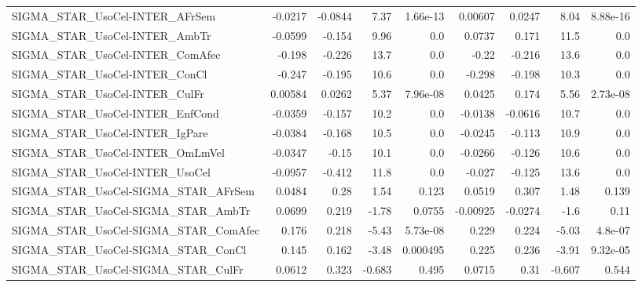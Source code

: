 \begin{tabular}{lrrrrrrrr}
SIGMA\_STAR\_UsoCel-INTER\_AFrSem        &     -0.0217 &      -0.0844 &     7.37 & 1.66e-13 &    0.00607 &      0.0247 &         8.04 &      8.88e-16 \\
SIGMA\_STAR\_UsoCel-INTER\_AmbTr         &     -0.0599 &       -0.154 &     9.96 &      0.0 &     0.0737 &       0.171 &         11.5 &           0.0 \\
SIGMA\_STAR\_UsoCel-INTER\_ComAfec       &      -0.198 &       -0.226 &     13.7 &      0.0 &      -0.22 &      -0.216 &         13.6 &           0.0 \\
SIGMA\_STAR\_UsoCel-INTER\_ConCl         &      -0.247 &       -0.195 &     10.6 &      0.0 &     -0.298 &      -0.198 &         10.3 &           0.0 \\
SIGMA\_STAR\_UsoCel-INTER\_CulFr         &     0.00584 &       0.0262 &     5.37 & 7.96e-08 &     0.0425 &       0.174 &         5.56 &      2.73e-08 \\
SIGMA\_STAR\_UsoCel-INTER\_EnfCond       &     -0.0359 &       -0.157 &     10.2 &      0.0 &    -0.0138 &     -0.0616 &         10.7 &           0.0 \\
SIGMA\_STAR\_UsoCel-INTER\_IgPare        &     -0.0384 &       -0.168 &     10.5 &      0.0 &    -0.0245 &      -0.113 &         10.9 &           0.0 \\
SIGMA\_STAR\_UsoCel-INTER\_OmLmVel       &     -0.0347 &        -0.15 &     10.1 &      0.0 &    -0.0266 &      -0.126 &         10.6 &           0.0 \\
SIGMA\_STAR\_UsoCel-INTER\_UsoCel        &     -0.0957 &       -0.412 &     11.8 &      0.0 &     -0.027 &      -0.125 &         13.6 &           0.0 \\
SIGMA\_STAR\_UsoCel-SIGMA\_STAR\_AFrSem   &      0.0484 &         0.28 &     1.54 &    0.123 &     0.0519 &       0.307 &         1.48 &         0.139 \\
SIGMA\_STAR\_UsoCel-SIGMA\_STAR\_AmbTr    &      0.0699 &        0.219 &    -1.78 &   0.0755 &   -0.00925 &     -0.0274 &         -1.6 &          0.11 \\
SIGMA\_STAR\_UsoCel-SIGMA\_STAR\_ComAfec  &       0.176 &        0.218 &    -5.43 & 5.73e-08 &      0.229 &       0.224 &        -5.03 &       4.8e-07 \\
SIGMA\_STAR\_UsoCel-SIGMA\_STAR\_ConCl    &       0.145 &        0.162 &    -3.48 & 0.000495 &      0.225 &       0.236 &        -3.91 &      9.32e-05 \\
SIGMA\_STAR\_UsoCel-SIGMA\_STAR\_CulFr    &      0.0612 &        0.323 &   -0.683 &    0.495 &     0.0715 &        0.31 &       -0.607 &         0.544 \\

\end{tabular}
